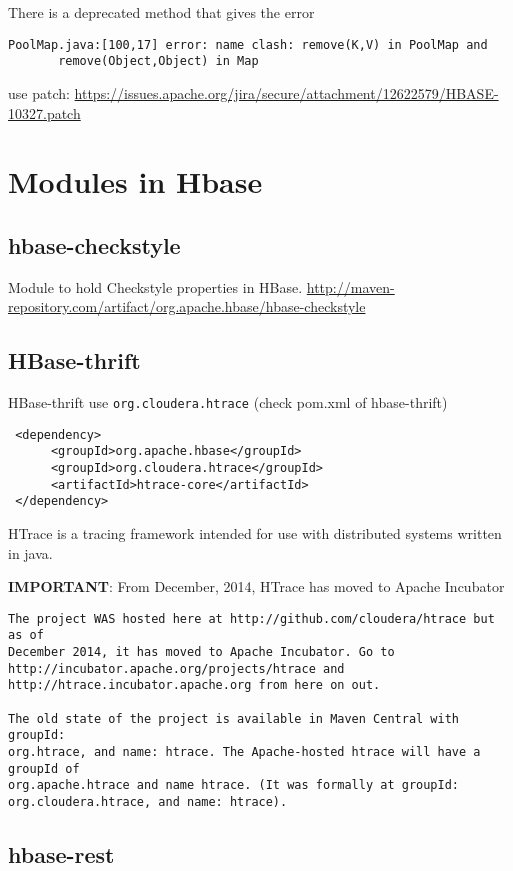 There is a deprecated method that gives the error
\begin{verbatim}
PoolMap.java:[100,17] error: name clash: remove(K,V) in PoolMap and
       remove(Object,Object) in Map 
\end{verbatim}
use patch:
\url{https://issues.apache.org/jira/secure/attachment/12622579/HBASE-10327.patch}


\section{Modules in Hbase}

\subsection{hbase-checkstyle}

Module to hold Checkstyle properties in HBase.
\url{http://maven-repository.com/artifact/org.apache.hbase/hbase-checkstyle}


\subsection{HBase-thrift}

HBase-thrift use \verb!org.cloudera.htrace! (check pom.xml of hbase-thrift) 
\begin{verbatim}
 <dependency>
      <groupId>org.apache.hbase</groupId>
      <groupId>org.cloudera.htrace</groupId>       
      <artifactId>htrace-core</artifactId>
 </dependency>         
\end{verbatim}
HTrace is a tracing framework intended for use with distributed systems written
in java.

{\bf IMPORTANT}: From December, 2014, HTrace has moved to Apache Incubator
\begin{verbatim}
The project WAS hosted here at http://github.com/cloudera/htrace but as of
December 2014, it has moved to Apache Incubator. Go to
http://incubator.apache.org/projects/htrace and
http://htrace.incubator.apache.org from here on out.  

The old state of the project is available in Maven Central with groupId:
org.htrace, and name: htrace. The Apache-hosted htrace will have a groupId of
org.apache.htrace and name htrace. (It was formally at groupId:
org.cloudera.htrace, and name: htrace).  
\end{verbatim}


\subsection{hbase-rest}
 
